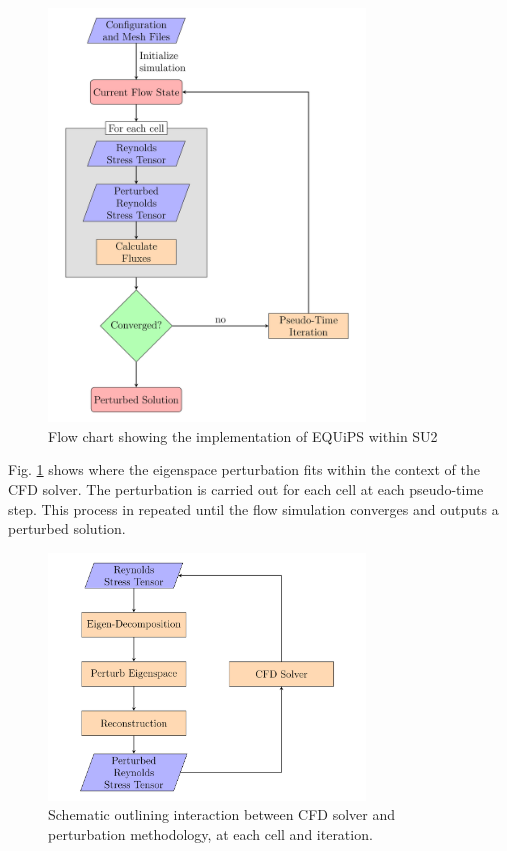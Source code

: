 \begin{figure}
\centering
\includegraphics[width=0.75\textwidth]{suthesis/images/su2_implmentation.png}
\caption{Flow chart showing the implementation of EQUiPS within SU2 \label{fig:equips_overview}}
\end{figure}

Fig. \ref{fig:equips_overview} shows where the eigenspace perturbation fits within the context of the CFD solver. The perturbation is carried out for each cell at each pseudo-time step. This process in repeated until the flow simulation converges and outputs a perturbed solution. 

\begin{figure}
\centering
\includegraphics[width=0.75\textwidth]{suthesis/images/eigenspace_pert.png}
\caption{Schematic outlining interaction between CFD solver and perturbation methodology, at each cell and iteration.\label{fig:perturbation_schematic}}
\end{figure}

